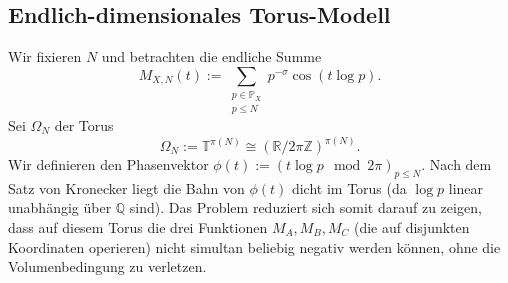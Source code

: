 \documentclass[11pt]{article}
\newcommand{\Pcal}{\mathbb P}
\begin{document}
\subsection{Endlich-dimensionales Torus-Modell}

Wir fixieren $N$ und betrachten die endliche Summe
\begin{equation}\label{eq:finite_main}
M_{X,N}(t):=\sum_{\substack{p\in \Pcal_X\\p\le N}} p^{-\sigma}\cos(t\log p).
\end{equation}
Sei $\Omega_N$ der Torus
\[
\Omega_N:=\mathbb T^{\pi(N)}\cong (\mathbb R/2\pi\mathbb Z)^{\pi(N)}.
\]
Wir definieren den Phasenvektor $\phi(t) := (t \log p \mod 2\pi)_{p \le N}$. Nach dem Satz von Kronecker liegt die Bahn von $\phi(t)$ dicht im Torus (da $\log p$ linear unabhängig über $\mathbb{Q}$ sind).
Das Problem reduziert sich somit darauf zu zeigen, dass auf diesem Torus die drei Funktionen $M_A, M_B, M_C$ (die auf disjunkten Koordinaten operieren) nicht simultan beliebig negativ werden können, ohne die Volumenbedingung zu verletzen.
\end{document}
